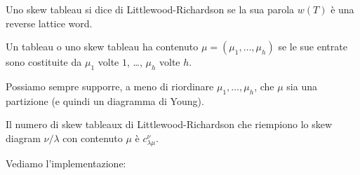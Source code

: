 \begin{defn}
Uno skew tableau si dice di Littlewood-Richardson se la sua parola
$w(T)$ \`e una reverse lattice word.
\end{defn}

\begin{defn}
Un tableau o uno skew tableau ha contenuto $\mu = (\mu_1, \ldots,
\mu_h)$ se le sue entrate sono costituite da $\mu_1$ volte $1$,
\ldots, $\mu_h$ volte $h$.
\end{defn}

\begin{oss}
Possiamo sempre supporre, a meno di riordinare $\mu_1, \ldots,\mu_h$,
che $\mu$ sia una partizione (e quindi un diagramma di Young).
\end{oss}

\begin{prop}
Il numero di skew tableaux di Littlewood-Richardson che riempiono lo
skew diagram $\nu/\lambda$ con contenuto $\mu$ \`e $c_{\lambda \mu}^{\nu}$.
\end{prop}

Vediamo l'implementazione:

